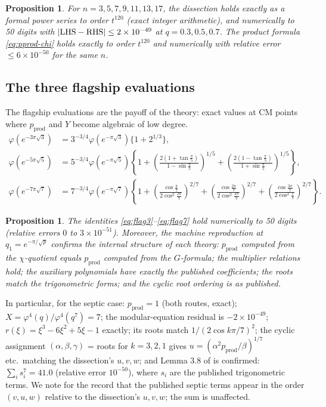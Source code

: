 \documentclass[11pt]{amsart}
\theoremstyle{plain}
\newtheorem{proposition}[theorem]{Proposition}
\theoremstyle{definition}
\theoremstyle{remark}
\newcommand{\pprod}{p_{\mathrm{prod}}}
\begin{document}
\begin{proposition}
For $n = 3, 5, 7, 9, 11, 13, 17$, the dissection holds exactly as a formal power
series to order $t^{120}$ (exact integer arithmetic), and numerically to 50 digits
with $|{\rm LHS} - {\rm RHS}| \leq 2\times 10^{-49}$ at $q = 0.3, 0.5, 0.7$.
The product formula \eqref{eq:pprod-chi} holds exactly to order $t^{120}$ and
numerically with relative error $\leq 6\times 10^{-50}$ for the same $n$.
\end{proposition}

\subsection{The three flagship evaluations}

The flagship evaluations are the payoff of the theory: exact values at CM points
where $\pprod$ and $Y$ become algebraic of low degree.
\begin{align}
\varphi(e^{-3\pi\sqrt{3}}) &= 3^{-3/4}\varphi(e^{-\pi\sqrt{3}})\{1+2^{1/3}\},
\label{eq:flag3} \\
\varphi(e^{-5\pi\sqrt{5}}) &= 5^{-3/4}\varphi(e^{-\pi\sqrt{5}})
\left\{1+\left(\frac{2(1+\tan\frac{\pi}{5})}{1-\sin\frac{\pi}{5}}\right)^{1/5}
+\left(\frac{2(1-\tan\frac{\pi}{5})}{1+\sin\frac{\pi}{5}}\right)^{1/5}\right\},
\label{eq:flag5} \\
\varphi(e^{-7\pi\sqrt{7}}) &= 7^{-3/4}\varphi(e^{-\pi\sqrt{7}})
\left\{1+\left(\frac{\cos\frac{\pi}{7}}{2\cos^2\frac{2\pi}{7}}\right)^{2/7}
+\left(\frac{\cos\frac{2\pi}{7}}{2\cos^2\frac{3\pi}{7}}\right)^{2/7}
+\left(\frac{\cos\frac{3\pi}{7}}{2\cos^2\frac{\pi}{7}}\right)^{2/7}\right\}.
\label{eq:flag7}
\end{align}

\begin{proposition}
The identities \eqref{eq:flag3}--\eqref{eq:flag7} hold numerically to 50 digits
(relative errors $0$ to $3\times 10^{-51}$). Moreover, the machine reproduction at
$q_1 = e^{-\pi/\sqrt{p}}$ confirms the internal structure of each theory:
$\pprod$ computed from the $\chi$-quotient equals $\pprod$ computed from the
$G$-formula; the multiplier relations hold; the auxiliary polynomials have exactly
the published coefficients; the roots match the trigonometric forms; and the cyclic
root ordering is as published.
\end{proposition}

In particular, for the septic case: $\pprod = 1$ (both routes, exact);
$X = \varphi^4(q)/\varphi^4(q^7) = 7$; the modular-equation residual is
$-2\times 10^{-49}$; $r(\xi) = \xi^3-6\xi^2+5\xi-1$ exactly; its roots match
$1/(2\cos k\pi/7)^2$; the cyclic assignment $(\alpha,\beta,\gamma)$ = roots for
$k=3,2,1$ gives $u = (\alpha^2\pprod/\beta)^{1/7}$ etc.\ matching the dissection's
$u,v,w$; and Lemma 3.8 of \cite{Reb23} is confirmed:
$\sum_i s_i^7 = 41.0$ (relative error $10^{-50}$), where $s_i$ are the published
trigonometric terms. We note for the record that the published septic terms appear
in the order $(v,u,w)$ relative to the dissection's $u,v,w$; the sum is unaffected.
\end{document}
